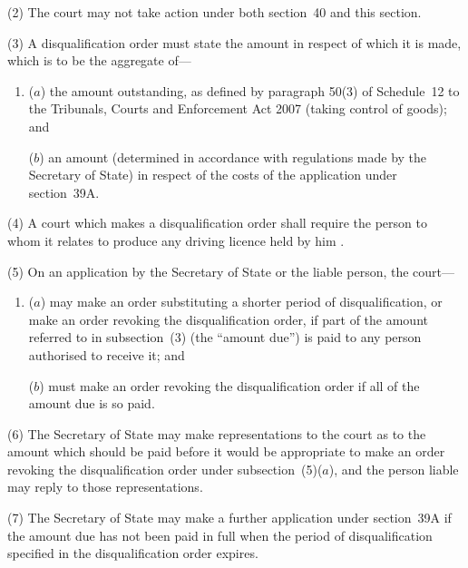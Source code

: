 \documentclass[12pt,a4paper]{article}
\begin{document}
(2) The court may not take action under both section~40 and this section.

(3) A disqualification order must state the amount in respect of which it is made, which is to be the aggregate of—
\begin{enumerate}\item[]

($a$) the amount outstanding, as defined by paragraph 50(3) of Schedule~12 to the Tribunals, Courts and Enforcement Act 2007 (taking control of goods); and

($b$) an amount (determined in accordance with regulations made by the Secretary of State) in respect of the costs of the application under section~39A.
\end{enumerate}

(4) A court which makes a disqualification order shall require the person to whom it relates to produce any driving licence held by him%
.

(5) On an application by the 
Secretary of State  %
or the liable person, the court—
\begin{enumerate}\item[]
($a$) may make an order substituting a shorter period of disqualification, or make an order revoking the disqualification order, if part of the amount referred to in subsection~(3)  (the “amount due”) is paid to any person authorised to receive it; and

($b$) must make an order revoking the disqualification order if all of the amount due is so paid.
\end{enumerate}

(6) The 
Secretary of State  %
may make representations to the court as to the amount which should be paid before it would be appropriate to make an order revoking the disqualification order under subsection~(5)($a$), and the person liable may reply to those representations.

(7) The 
Secretary of State  %
may make a further application under section~39A if the amount due has not been paid in full when the period of disqualification specified in the disqualification order expires.
\end{document}
